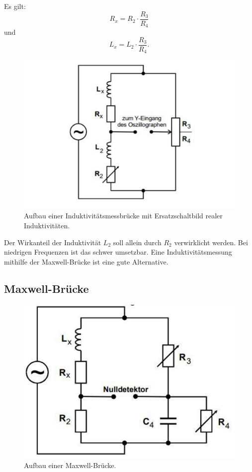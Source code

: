 Es gilt:
\begin{equation} \label{eqn:induktivität_r}
    R_x = R_2 \cdot \frac{R_3}{R_4}
\end{equation}
und
\begin{equation} \label{eqn:induktivität_l}
    L_x = L_2 \cdot \frac{R_3}{R_4} .
\end{equation}

\begin{figure}
    \centering
    \includegraphics[width=\textwidth]{InduBruecke.pdf}
    \caption{Aufbau einer Induktivitätsmessbrücke mit Ersatzschaltbild realer Induktivitäten. \cite{anleitung}}
\end{figure}

Der Wirkanteil der Induktivität $L_2$ soll allein durch $R_2$ verwirklicht werden.
Bei niedrigen Frequenzen ist das schwer umsetzbar.
Eine Induktivitätsmessung mithilfe der Maxwell-Brücke ist eine gute Alternative.

\subsection{Maxwell-Brücke}

\begin{figure}
    \centering
    \includegraphics[width=\textwidth]{MaxwellBruecke.pdf}
    \caption{Aufbau einer Maxwell-Brücke. \cite{anleitung}}
    \label{fig:Maxwell}
\end{figure}

